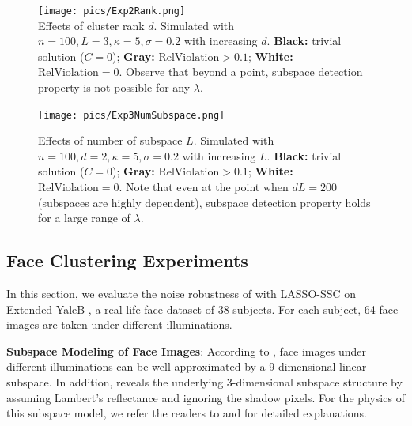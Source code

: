 \documentclass[twoside,11pt]{article}
\numberwithin{equation}{section}
\begin{document}
\begin{figure}[ht]

\begin{minipage}[t]{0.48\textwidth}
  \centering
  \texttt{[image: pics/Exp2Rank.png]}\\
  \caption[Effects of cluster rank $d$.]{Effects of cluster rank $d$. Simulated with $n=100, L=3, \kappa=5, \sigma=0.2$ with increasing $d$. \textbf{Black:} trivial solution ($C=0$); \textbf{Gray:} $\mathrm{RelViolation}>0.1$; \textbf{White:} $\mathrm{RelViolation}=0$.  Observe that beyond a point, subspace detection property is not possible for any $\lambda$. }\label{fig:Exp2_rank}
\end{minipage}
\hspace{0.02\textwidth}
\begin{minipage}[t]{0.48\textwidth}
  \centering
  \texttt{[image: pics/Exp3NumSubspace.png]}\\
  \caption[Effects of number of subspace $L$.]{Effects of number of subspace $L$. Simulated with $n=100, d=2, \kappa=5, \sigma=0.2$ with increasing $L$. \textbf{Black:} trivial solution ($C=0$); \textbf{Gray:} $\mathrm{RelViolation}>0.1$; \textbf{White:} $\mathrm{RelViolation}=0$.  Note that even at the point when $dL=200$(subspaces are highly dependent), subspace detection property holds for a large range of $\lambda$. }\label{fig:Exp3_L}
\end{minipage}

\end{figure}


\subsection{Face Clustering Experiments}
In this section, we evaluate the noise robustness of with LASSO-SSC on Extended YaleB \citep{lee2005extendedyaleb}, a real life face dataset of 38 subjects. For each subject, 64 face images are taken under different illuminations.



\textbf{Subspace Modeling of Face Images}:
According to \citet{basri2003lambertianface}, face images under different illuminations can be well-approximated by a 9-dimensional linear subspace. In addition, \citet{zhou2007PhotometricFace} reveals the underlying 3-dimensional subspace structure by assuming Lambert's reflectance and ignoring the shadow pixels. For the physics of this subspace model, we refer the readers to \citet{basri2003lambertianface} and \citet{zhou2007PhotometricFace} for detailed explanations.
\end{document}
